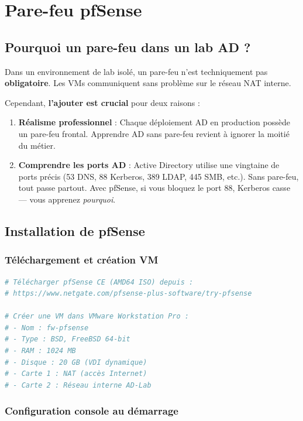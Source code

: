 \chapter{Pare-feu pfSense}

\section{Pourquoi un pare-feu dans un lab AD ?}

Dans un environnement de lab isolé, un pare-feu n'est techniquement pas \textbf{obligatoire}. Les VMs communiquent sans problème sur le réseau NAT interne.

Cependant, \textbf{l'ajouter est crucial} pour deux raisons :

\begin{enumerate}
    \item \textbf{Réalisme professionnel} : Chaque déploiement AD en production possède un pare-feu frontal. Apprendre AD sans pare-feu revient à ignorer la moitié du métier.
    
    \item \textbf{Comprendre les ports AD} : Active Directory utilise une vingtaine de ports précis (53 DNS, 88 Kerberos, 389 LDAP, 445 SMB, etc.). Sans pare-feu, tout passe partout. Avec pfSense, si vous bloquez le port 88, Kerberos casse — vous apprenez \textit{pourquoi}.
\end{enumerate}

\section{Installation de pfSense}

\subsection{Téléchargement et création VM}

\begin{lstlisting}[language=bash]
# Télécharger pfSense CE (AMD64 ISO) depuis :
# https://www.netgate.com/pfsense-plus-software/try-pfsense

# Créer une VM dans VMware Workstation Pro :
# - Nom : fw-pfsense
# - Type : BSD, FreeBSD 64-bit
# - RAM : 1024 MB
# - Disque : 20 GB (VDI dynamique)
# - Carte 1 : NAT (accès Internet)
# - Carte 2 : Réseau interne AD-Lab
\end{lstlisting}

\subsection{Configuration console au démarrage}

